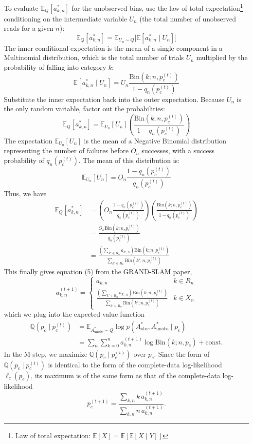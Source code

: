 \documentclass[11pt]{article}
\begin{document}
To evaluate $\mathbb{E}_Q[a^*_{k,n}]$ for the unobserved bins, use the law of total expectation\footnote{Law of total expectation: $\mathbb{E}[X] = \mathbb{E}[\mathbb{E}[X \mid Y]]$} conditioning on the intermediate variable $U_n$ (the total number of unobserved reads for a given $n$):
$$
\mathbb{E}_Q[a^*_{k,n}] = \mathbb{E}_{U_n \sim Q} \big[ \mathbb{E}[a^*_{k,n} \mid U_n] \big]
$$
The inner conditional expectation is the mean of a single component in a Multinomial distribution, which is the total number of trials $U_n$ multiplied by the probability of falling into category $k$:
$$
\mathbb{E}[a^*_{k,n} \mid U_n] = U_n \frac{\mathrm{Bin}(k;n,p_c^{(t)})}{1-q_n(p_c^{(t)})}
$$
Substitute the inner expectation back into the outer expectation. Because $U_n$ is the only random variable, factor out the probabilities:
$$
\mathbb{E}_Q[a^*_{k,n}] = \mathbb{E}_{U_n} [ U_n ] \left( \frac{\mathrm{Bin}(k;n,p_c^{(t)})}{1-q_n(p_c^{(t)})} \right)
$$
The expectation $\mathbb{E}_{U_n} [ U_n ]$ is the mean of a Negative Binomial distribution representing the number of failures before $O_n$ successes, with a success probability of $q_n(p_c^{(t)})$. The mean of this distribution is:
$$
\mathbb{E}_{U_n}[U_n] = O_n \frac{1 - q_n(p_c^{(t)})}{q_n(p_c^{(t)})}
$$
Thus, we have
$$
\begin{aligned}
\mathbb{E}_Q[a^*_{k,n}]
&= \left( O_n \frac{1 - q_n(p_c^{(t)})}{q_n(p_c^{(t)})} \right) \left( \frac{\mathrm{Bin}(k;n,p_c^{(t)})}{1-q_n(p_c^{(t)})} \right) \\
&= \frac{O_n \mathrm{Bin}(k;n,p_c^{(t)})}{q_n(p_c^{(t)})} \\
&= \frac{\left(\sum_{k' \in R_n} a_{k',n}\right) \mathrm{Bin}(k;n,p_c^{(t)})}{\sum_{k'\in R_n}\mathrm{Bin}(k';n,p_c^{(t)})}
\end{aligned}
$$
This finally gives equation (5) from the GRAND-SLAM paper,
$$
a^{(t+1)}_{k,n} = \begin{cases}
a_{k,n} & k \in R_n \\
\frac{\left(\sum_{k' \in R_n} a_{k',n}\right) \mathrm{Bin}(k;n,p_c^{(t)})}{\sum_{k'\in R_n}\mathrm{Bin}(k';n,p_c^{(t)})} & k \in X_n
\end{cases}
$$
which we plug into the expected value function
$$
\begin{aligned}
\mathbb{Q}(p_c \mid p_c^{(t)})
&= \mathbb{E}_{A_\text{unobs}^* \sim Q} \log p(A_\text{obs}^*, A_\text{unobs}^* \mid p_c) \\
&= \sum_n \sum_{k=0}^n a^{(t+1)}_{k,n} \log \mathrm{Bin}(k;n,p_c)+\text{const}.
\end{aligned}
$$
In the M-step, we maximize $\mathbb{Q}(p_c \mid p_c^{(t)})$ over $p_c$. Since the form of $\mathbb{Q}(p_c \mid p_c^{(t)})$ is identical to the form of the complete-data log-likelihood $\ell_c(p_c)$, its maximum is of the same form as that of the complete-data log-likelihood
\[
p_c^{(t+1)}
=
\frac{\sum_{k,n} k\,a^{(t+1)}_{k,n}}{\sum_{k,n} n\,a^{(t+1)}_{k,n}}.
\]
\end{document}
